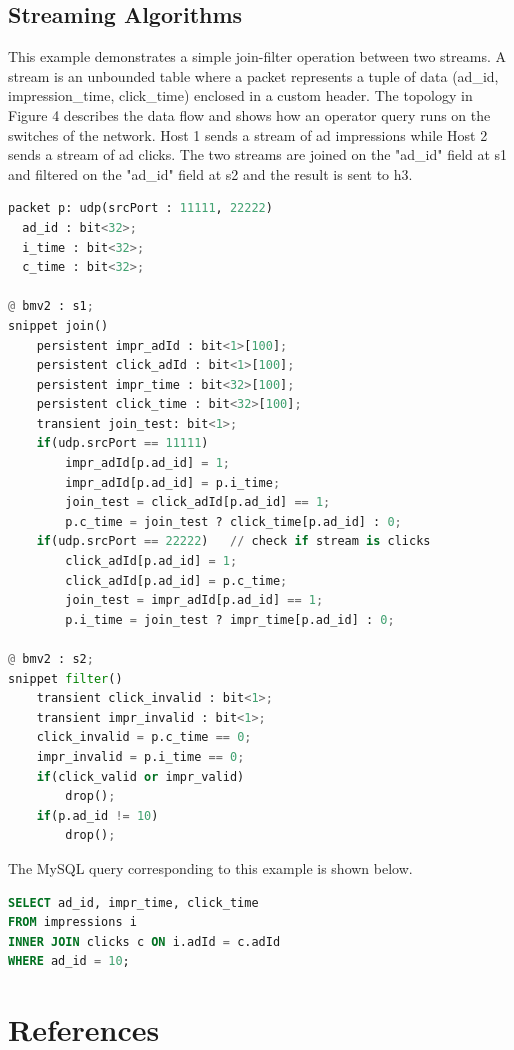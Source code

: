\subsection{Streaming Algorithms}
This example demonstrates a simple join-filter operation between two streams. A stream is an unbounded table where a packet represents a tuple of data (ad\_id, impression\_time, click\_time) enclosed in a custom header. The topology in Figure 4 describes the data flow and shows how an operator query runs on the switches of the network. Host 1 sends a stream of ad impressions while Host 2 sends a stream of ad clicks. The two streams are joined on the "ad\_id" field at s1 and filtered on the "ad\_id" field at s2 and the result is sent to h3. 
\begin{lstlisting}[language=Python, basicstyle=\scriptsize]
packet p: udp(srcPort : 11111, 22222)
  ad_id : bit<32>;
  i_time : bit<32>;
  c_time : bit<32>;

@ bmv2 : s1;
snippet join()                    
	persistent impr_adId : bit<1>[100];
	persistent click_adId : bit<1>[100];
	persistent impr_time : bit<32>[100];
	persistent click_time : bit<32>[100];
	transient join_test: bit<1>;
	if(udp.srcPort == 11111)   
		impr_adId[p.ad_id] = 1;
		impr_adId[p.ad_id] = p.i_time;
		join_test = click_adId[p.ad_id] == 1;
		p.c_time = join_test ? click_time[p.ad_id] : 0;
	if(udp.srcPort == 22222)   // check if stream is clicks
		click_adId[p.ad_id] = 1;
		click_adId[p.ad_id] = p.c_time;
		join_test = impr_adId[p.ad_id] == 1;
		p.i_time = join_test ? impr_time[p.ad_id] : 0;

@ bmv2 : s2;
snippet filter()  
	transient click_invalid : bit<1>;
	transient impr_invalid : bit<1>;
	click_invalid = p.c_time == 0;
	impr_invalid = p.i_time == 0;
	if(click_valid or impr_valid)
		drop();
	if(p.ad_id != 10)
		drop();
\end{lstlisting}


\noindent The MySQL query corresponding to this example is shown below.
\begin{lstlisting}[language=SQL, basicstyle=\scriptsize]
SELECT ad_id, impr_time, click_time 
FROM impressions i 
INNER JOIN clicks c ON i.adId = c.adId
WHERE ad_id = 10;
\end{lstlisting}

\section{References}
